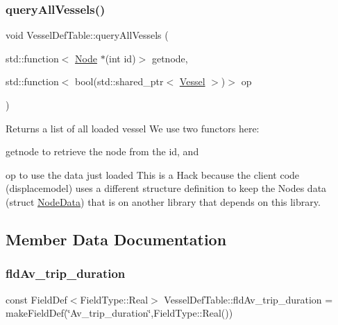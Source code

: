 \subsubsection{\texorpdfstring{queryAllVessels()}{queryAllVessels()}}
{\footnotesize\ttfamily void Vessel\+Def\+Table\+::query\+All\+Vessels (\begin{DoxyParamCaption}\item[{std\+::function$<$ \mbox{\hyperlink{class_node}{Node}} $\ast$(int id)$>$}]{getnode,  }\item[{std\+::function$<$ bool(std\+::shared\+\_\+ptr$<$ \mbox{\hyperlink{class_vessel}{Vessel}} $>$)$>$}]{op }\end{DoxyParamCaption})}



Returns a list of all loaded vessel We use two functors here\+: 


\begin{DoxyItemize}
\item getnode to retrieve the node from the id, and
\item op to use the data just loaded This is a Hack because the client code (displacemodel) uses a different structure definition to keep the Nodes data (struct \mbox{\hyperlink{class_node_data}{Node\+Data}}) that is on another library that depends on this library. 
\end{DoxyItemize}

\subsection{Member Data Documentation}
\mbox{\label{class_vessel_def_table_a92834078ff76e4576ff0c9aa957d225f}} 
\subsubsection{\texorpdfstring{fldAv\_trip\_duration}{fldAv\_trip\_duration}}
{\footnotesize\ttfamily const Field\+Def$<$Field\+Type\+::\+Real$>$ Vessel\+Def\+Table\+::fld\+Av\+\_\+trip\+\_\+duration = make\+Field\+Def(\char`\"{}Av\+\_\+trip\+\_\+duration\char`\"{},Field\+Type\+::\+Real())}

\mbox{\label{class_vessel_def_table_ac67fb77a644568c1a806ffbb8630c7c4}} 
